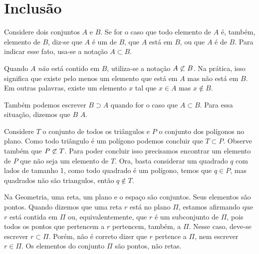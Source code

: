 \section{Inclusão}

\begin{definition}
\label{def:subset}
Considere dois conjuntos $A$ e $B$.
Se for o caso que todo elemento de $A$ é, também, elemento de $B$, diz-se que $A$ é um  de $B$, que $A$ está  em $B$, ou que $A$ é  de $B$.
Para indicar esse fato, usa-se a notação $A \subset B$.

\label{def:notsubset}
Quando $A$ \textit{não} está contido em $B$,  utiliza-se a notação  $A \not\subset B$.
Na prática, isso significa que existe pelo menos um elemento que está em $A$ mas não está em $B$.
Em outras palavras, existe um elemento $x$ tal que $x \in A$ mas $x \notin B$.
\end{definition}



\begin{remark}
Também podemos escrever $B \supset A$ quando for o caso que $A \subset B$. Para essa situação, dizemos que $B$  $A$.
\end{remark}

\begin{example}
Considere $T$ o conjunto de todos os triângulos e $P$ o conjunto dos polígonos no plano. Como todo triângulo é um polígono podemos concluir que $T \subset P$.
Observe também que $P \not\subset T$. Para poder concluir isso precisamos encontrar um elemento de $P$ que não seja um elemento de $T$. Ora, basta considerar um quadrado $q$ com lados de tamanho 1, como todo quadrado é um polígono, temos que $q \in P$, mas quadrados não são triangulos, então $q \notin T$.
\end{example}

\begin{example}
Na Geometria, uma reta, um plano e o espaço são conjuntos. Seus
elementos são pontos. Quando dizemos que uma reta $r$ está no plano $\Pi$, estamos afirmando que $r$ está contida em $\Pi$ ou, equivalentemente, que $r$ é um subconjunto de $\Pi$, pois todos os pontos que pertencem a $r$ pertencem, também, a $\Pi$. Nesse caso, deve-se escrever $ r \subset \Pi$. Porém, não é correto dizer que $r$ pertence a $\Pi$, nem escrever $r \in \Pi$. Os
elementos do conjunto $\Pi$ são pontos, não retas.
\end{example}

